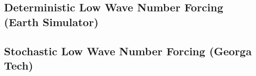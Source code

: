 \documentclass[12pt]{article}
\begin{document}
\subsection{Deterministic Low Wave Number Forcing (Earth Simulator)}

\subsection{Stochastic Low Wave Number Forcing (Georga Tech)}
\end{document}

